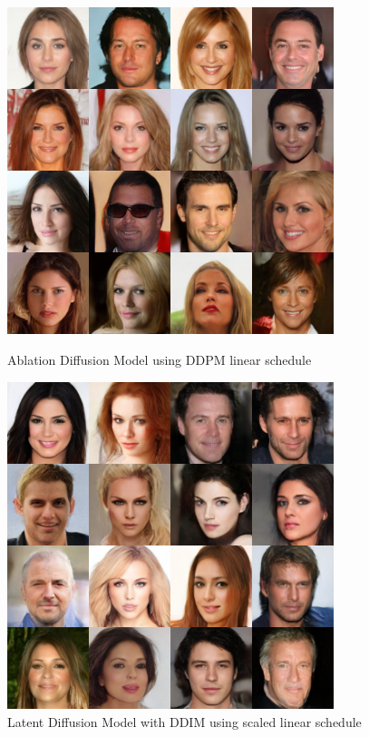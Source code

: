 \documentclass[conference]{IEEEtran}
\begin{document}
\begin{figure}[H]
   \begin{minipage}{0.50\textwidth}
    \centering
    \includegraphics[width=0.85\textwidth]{figures/figure11_adm_ddpm_linear.png}
    \caption{Ablation Diffusion Model using DDPM linear schedule} \label{fig:adm_ddpm}
    \end{minipage}
       \begin{minipage}{0.50\textwidth}
        \includegraphics[width=0.85\textwidth]{figures/figure12_ldm_ddim_scaled_linear.png} \caption{Latent Diffusion Model with DDIM using scaled linear schedule} \label{fig:ldm_ddim}
    \end{minipage}
\end{figure}
\FloatBarrier
\end{document}
